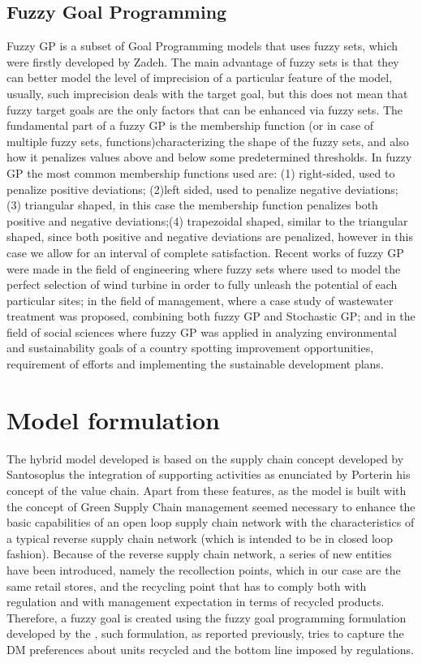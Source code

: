 \begin{doublespace}
  \subsection{Fuzzy Goal Programming}
  Fuzzy GP is a subset of Goal Programming models that uses fuzzy sets, which were firstly developed by Zadeh\cite{Zadeh1965}. The main advantage of fuzzy sets is that they can better model the level of imprecision of a particular feature of the model, usually, such imprecision deals with the target goal, but this does not mean that fuzzy target goals are the only factors that can be enhanced via fuzzy sets. The fundamental part of a fuzzy GP is the membership function (or in case of multiple fuzzy sets, functions)characterizing the shape of the fuzzy sets, and also how it penalizes values above and below some predetermined thresholds. In fuzzy GP the most common membership functions used are: (1) right-sided, used to penalize positive deviations; (2)left sided, used to penalize negative deviations; (3) triangular shaped, in this case the membership function penalizes both positive and negative deviations;(4) trapezoidal shaped, similar to the triangular shaped, since both positive and negative deviations are penalized, however in this case we allow for an interval of complete satisfaction.
  Recent works of fuzzy GP were made in the field of engineering where fuzzy sets where used to model the perfect selection of wind turbine in order to fully unleash the potential of each particular sites\cite{Rehman2017}; in the field of management, where a case study of wastewater treatment was proposed, combining both fuzzy GP and Stochastic GP\cite{Diaz-Madronero2018}; and in the field of social sciences where fuzzy GP was applied in analyzing environmental and sustainability goals of a country spotting improvement opportunities, requirement of efforts and implementing the sustainable development plans\cite{Nomani2016}.   
  \pagebreak

\section{Model formulation}
The hybrid model developed is based on the supply chain concept developed by Santoso\cite{Santoso2005}plus the integration of supporting activities as enunciated by Porter\cite{Porter1998}in his concept of the value chain. Apart from these features, as the model is built with the concept of Green Supply Chain management seemed necessary to enhance the basic capabilities of an open loop supply chain network with the characteristics of a typical reverse supply chain network (which is intended to be in closed loop fashion). Because of the reverse supply chain network, a series of new entities have been introduced, namely the recollection points, which in our case are the same retail stores, and the recycling point that has to comply both with regulation and with management expectation in terms of recycled products. Therefore, a fuzzy goal is created using the fuzzy goal programming formulation developed by the \cite{Yaghoobi2008}, such formulation, as reported previously, tries to capture the DM preferences about units recycled and the bottom line imposed by regulations.


\end{doublespace}
